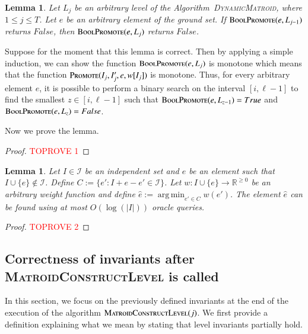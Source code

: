 \documentclass[11pt]{article}
\newtheorem{lemma}[theorem]{Lemma}
\newcommand{\mI}{{\mathcal{I}}}
\DeclareMathOperator{\argmin}{arg\,min}
\newcommand{\suit}{\textsc{Promote}}
\newcommand{\boolsuit}{\textsc{BoolPromote}}
\newcommand{\dynamicmatroid}{\textsc{DynamicMatroid}}
\newcommand{\MatroidConstLevel}{\textsc{MatroidConstructLevel}}
\begin{document}
\begin{lemma}
\label{lm:binary_search_argument}
Let $L_j$ be an arbitrary level of the Algorithm~\dynamicmatroid{}, where $1 \le j \le T$. 
Let $e$ be an arbitrary element of the ground set. 
If $\boolsuit(e,L_{j-1})$ returns $False$, then 
$\boolsuit(e,L_{j})$ returns $False$. 
\end{lemma}

Suppose for the moment that this lemma is correct. 
Then by applying a simple induction, 
we can show the function $\boolsuit(e,L_j)$ 
is monotone which means that the function $\suit(I_j, I'_j, e, w[I_j])$ is monotone. 
Thus, for every arbitrary element $e$, 
it is possible to perform a binary search on the interval $[i, \ell-1]$ 
to find the smallest $z\in [i, \ell-1]$ such that $\boolsuit(e,L_{z-1}) = True$ and $\boolsuit(e,L_z) = False$.   


Now we prove the lemma. 

\begin{proof}\textcolor{red}{TOPROVE 1}\end{proof}


\begin{lemma}\label{lm:find_min} Let $I \in \mI$ be an independent set and $e$ be an element such that $I \cup \{e\} \notin \mI$.
  Define $C := \{e': I + e - e' \in \mI\}$.
  Let $w : I \cup \{e\} \to \mathbb{R}^{\ge 0}$ be an arbitrary weight function and
  define $\hat{e} := \argmin_{e'\in C} w(e')$. The element $\hat{e}$ can be found
  using at most $O(\log(|I|))$ oracle queries.
\end{lemma}
\begin{proof}\textcolor{red}{TOPROVE 2}\end{proof}

\subsection{Correctness of invariants after \MatroidConstLevel{} is called}
\label{sec:level:proofs:matroid}

In this section, we focus on the previously defined invariants at the end of the execution of the algorithm $\MatroidConstLevel{}(j)$. 
We first provide a definition explaining what we mean by stating that level invariants partially hold. 
\end{document}
